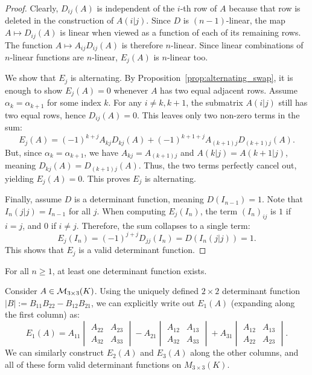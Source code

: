 \begin{proof}
  Clearly, $D_{ij}(A)$ is independent of the $i$-th row of $A$ because that row is deleted in the construction of $A(i|j)$. Since $D$ is $(n-1)$-linear, the map $A \mapsto D_{ij}(A)$ is linear when viewed as a function of each of its remaining rows. The function $A \mapsto A_{ij} D_{ij}(A)$ is therefore $n$-linear. Since linear combinations of $n$-linear functions are $n$-linear, $E_j(A)$ is $n$-linear too.

  We show that $E_j$ is alternating. By Proposition~\ref{prop:alternating_swap}, it is enough to show $E_j(A) = 0$ whenever $A$ has two equal adjacent rows.
  Assume $\alpha_k = \alpha_{k+1}$ for some index $k$. For any $i \neq k, k+1$, the submatrix $A(i|j)$ still has two equal rows, hence $D_{ij}(A) = 0$. This leaves only two non-zero terms in the sum:
  \[
  E_j(A) = (-1)^{k+j} A_{kj} D_{kj}(A) + (-1)^{k+1+j} A_{(k+1)j} D_{(k+1)j}(A).
  \] %
  But, since $\alpha_k = \alpha_{k+1}$, we have $A_{kj} = A_{(k+1)j}$ and $A(k|j) = A(k+1|j)$, meaning $D_{kj}(A) = D_{(k+1)j}(A)$. Thus, the two terms perfectly cancel out, yielding $E_j(A) = 0$. This proves $E_j$ is alternating.

  Finally, assume $D$ is a determinant function, meaning $D(I_{n-1}) = 1$. Note that $I_n(j|j) = I_{n-1}$ for all $j$. When computing $E_j(I_n)$, the term $(I_n)_{ij}$ is $1$ if $i=j$, and $0$ if $i \neq j$. Therefore, the sum collapses to a single term:
  \[
  E_j(I_n) = (-1)^{j+j} D_{jj}(I_n) = D(I_n(j|j)) = 1.
  \]
  This shows that $E_j$ is a valid determinant function.
\end{proof}

\begin{corollary}\label{cor:det_exists}
  For all $n \ge 1$, at least one determinant function exists.
\end{corollary}

\begin{example}
  Consider $A \in \mathcal{M}_{3 \times 3}(K)$. Using the uniquely defined $2 \times 2$ determinant function $|B| := B_{11}B_{22} - B_{12}B_{21}$, we can explicitly write out $E_1(A)$ (expanding along the first column) as:
  \[
  E_1(A) = A_{11} \begin{vmatrix} A_{22} & A_{23} \\ A_{32} & A_{33} \end{vmatrix} - A_{21} \begin{vmatrix} A_{12} & A_{13} \\ A_{32} & A_{33} \end{vmatrix} + A_{31} \begin{vmatrix} A_{12} & A_{13} \\ A_{22} & A_{23} \end{vmatrix}.
  \]
  We can similarly construct $E_2(A)$ and $E_3(A)$ along the other columns, and all of these form valid determinant functions on $M_{3 \times 3}(K)$.
\end{example}

